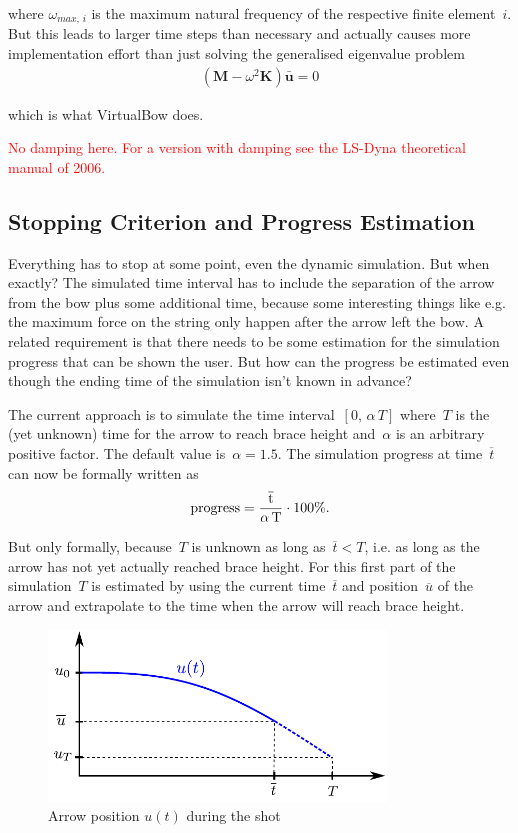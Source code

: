 where $\omega_{max,\,i}$ is the maximum natural frequency of the respective finite element~$i$. But this leads to larger time steps than necessary and actually causes more implementation effort than just solving the generalised eigenvalue problem
%
\begin{align}
\left(\boldsymbol{M} - \omega^2\boldsymbol{K}\right)\boldsymbol{\bar{u}} = 0\label{eq:natural_frequencies}
\end{align}

which is what VirtualBow does.

\textcolor{red}{No damping here. For a version with damping see the LS-Dyna theoretical manual of 2006.}

\subsection{Stopping Criterion and Progress Estimation}

Everything has to stop at some point, even the dynamic simulation. But when exactly?
The simulated time interval has to include the separation of the arrow from the bow plus some additional time, because some interesting things like e.g. the maximum force on the string only happen after the arrow left the bow.
A related requirement is that there needs to be some estimation for the simulation progress that can be shown the user.
But how can the progress be estimated even though the ending time of the simulation isn't known in advance?

The current approach is to simulate the time interval~$[0,\,\alpha\,T]$ where~$T$ is the (yet unknown) time for the arrow to reach brace height and~$\alpha$ is an arbitrary positive factor.
The default value is~$\alpha = 1.5$. The simulation progress at time~$\overline{t}$ can now be formally written as
%
\begin{equation}
\rm{progress} = \frac{\overline{t}}{\alpha\,T}\cdot 100\%.\label{eq:solution:progress}
\end{equation}

But only formally, because~$T$ is unknown as long as~$\overline{t} < T$, i.e. as long as the arrow has not yet actually reached brace height. For this first part of the simulation~$T$ is estimated by using the current time~$\overline{t}$ and position~$\overline{u}$ of the arrow and extrapolate to the time when the arrow will reach brace height.

\begin{figure}[h]
\centering
\includegraphics[width=0.8\textwidth]{figures/solution/dynamic_progress}
\caption{Arrow position $u(t)$ during the shot}
\label{fig:solution:dynamic_progress}
\end{figure}

